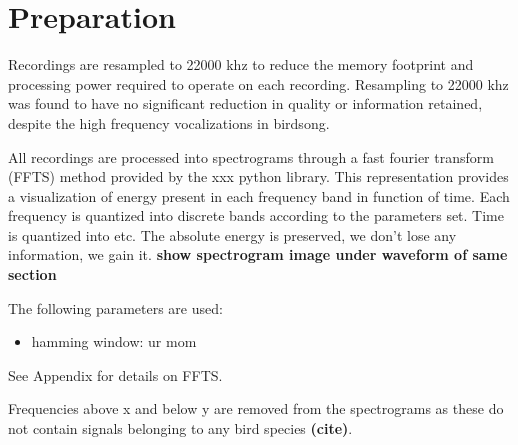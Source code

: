 \section{Preparation}
Recordings are resampled to 22000 khz to reduce the memory footprint and
processing power required to operate on each recording.
Resampling to 22000 khz was found to have no significant reduction in quality
or information retained, despite the high frequency vocalizations in birdsong.

All recordings are processed into spectrograms through a fast fourier transform
(FFTS) method provided by the xxx python library.
This representation provides a visualization of energy present in each frequency
band in function of time.
Each frequency is quantized into discrete bands according to the parameters set.
Time is quantized into etc.
The absolute energy is preserved, we don't lose any information, we gain it.
\textbf{show spectrogram image under waveform of same section}

The following parameters are used:
\begin{itemize}
  \item hamming window: ur mom
\end{itemize}

See Appendix for details on FFTS.

Frequencies above x and below y are removed from the spectrograms as these do
not contain signals belonging to any bird species \textbf{(cite)}.
